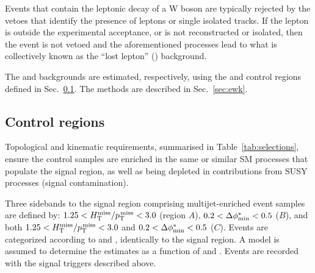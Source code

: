 Events that contain the leptonic decay of a W boson are typically
rejected by the vetoes that identify the presence of leptons or single
isolated tracks. If the lepton is outside the experimental acceptance,
or is not reconstructed or isolated, then the event is not vetoed and
the aforementioned processes lead to what is collectively known as the
``lost lepton'' (\lost) background.

The \lost and \znunuj backgrounds are estimated, respectively, using
the \mj and \mmj control regions defined in 
Sec.~\ref{sec:control}. The methods are described in
Sec.~\ref{sec:ewk}. 


\subsection{Control regions}
\label{sec:control}

Topological and kinematic requirements, summarised in
Table~\ref{tab:selections}, ensure the control samples are enriched in
the same or similar SM processes that populate the signal region, as
well as being depleted in contributions from SUSY processes (signal
contamination). 

Three sidebands to the signal region comprising multijet-enriched
event samples are defined by: $1.25 < H_{\text{T}}^{\text{miss}} / p_{\text{T}}^{\kern1pt\text{miss}} < 3.0$ (region $A$),
$0.2 < \Delta\phi^{*}_\text{min} < 0.5$ ($B$), and both $1.25 < H_{\text{T}}^{\text{miss}} / p_{\text{T}}^{\kern1pt\text{miss}} < 3.0$ and $0.2 <
\Delta\phi^{*}_\text{min} < 0.5$ ($C$). Events are categorized according to \njet and
\scalht, identically to the signal region. A model is assumed to
determine the estimates as a function of \nb and \mht. Events are
recorded with the signal triggers described above.

